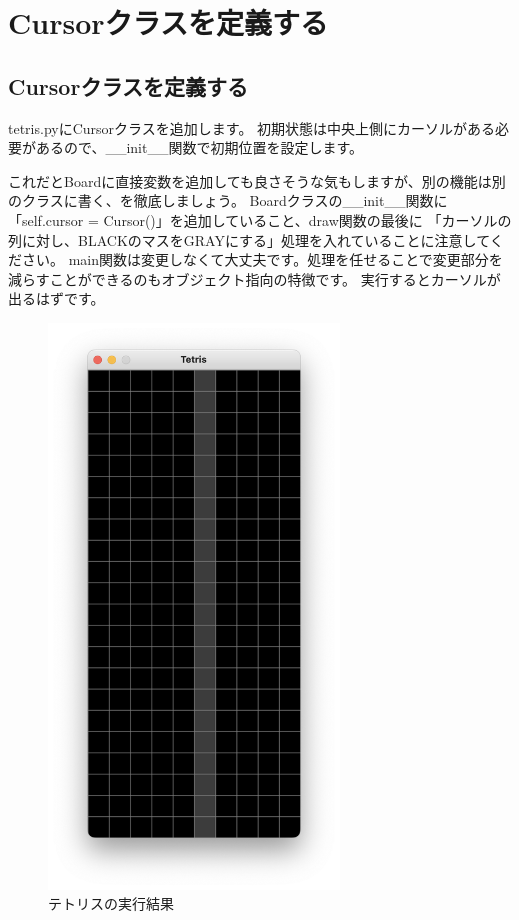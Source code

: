 \section{Cursorクラスを定義する}
\subsection{Cursorクラスを定義する}
tetris.pyにCursorクラスを追加します。
初期状態は中央上側にカーソルがある必要があるので、\_\_init\_\_関数で初期位置を設定します。

これだとBoardに直接変数を追加しても良さそうな気もしますが、別の機能は別のクラスに書く、を徹底しましょう。
Boardクラスの\_\_init\_\_関数に「self.cursor = Cursor()」を追加していること、draw関数の最後に
「カーソルの列に対し、BLACKのマスをGRAYにする」処理を入れていることに注意してください。
main関数は変更しなくて大丈夫です。処理を任せることで変更部分を減らすことができるのもオブジェクト指向の特徴です。
実行するとカーソルが出るはずです。

\begin{figure}[h]
  \centering
  \includegraphics[height=15cm, natwidth=824,natheight=1600]{images/TetrisCH5.png}
  \caption{テトリスの実行結果}
\end{figure}

